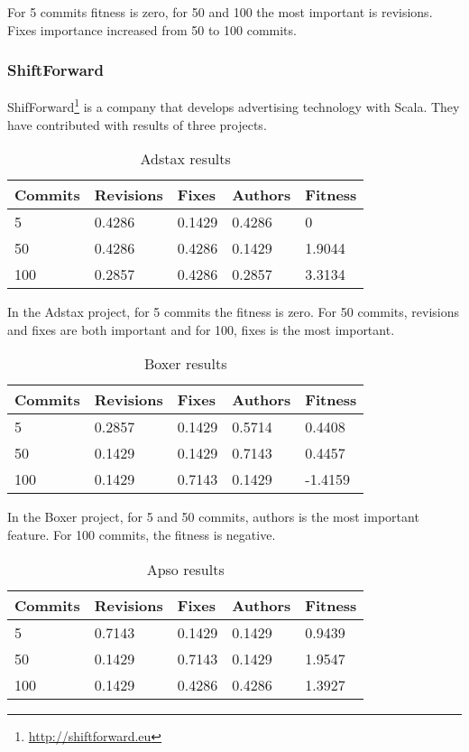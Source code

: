 For 5 commits fitness is zero, for 50 and 100 the most important is revisions.
Fixes importance increased from 50 to 100 commits.

\subsubsection{ShiftForward}
ShifForward\footnote{\url{http://shiftforward.eu}} is a company that develops
advertising technology with Scala. They have contributed with results of three
projects.

\begin{table}[H]
    \centering
    \caption{Adstax results}
    \label{table:learning_adstax}
    \begin{tabular}{|l|l|l|l|l|}
        \hline
        Commits & Revisions & Fixes & Authors & Fitness \\ \hline
        5         & 0.4286     & 0.1429 & 0.4286   & 0 \\ \hline
        50        & 0.4286 & 0.4286 & 0.1429   & 1.9044 \\ \hline
        100       & 0.2857     & 0.4286  & 0.2857   & 3.3134 \\ \hline
    \end{tabular}
\end{table}

In the Adstax project, for 5 commits the fitness is zero. For 50 commits,
revisions and fixes are both important and for 100, fixes is the most important.

\begin{table}[H]
    \centering
    \caption{Boxer results}
    \label{table:learning_boxer}
    \begin{tabular}{|l|l|l|l|l|}
        \hline
        Commits & Revisions & Fixes & Authors & Fitness \\ \hline
        5         & 0.2857     & 0.1429 & 0.5714   & 0.4408 \\ \hline
        50        & 0.1429 & 0.1429 & 0.7143   & 0.4457  \\ \hline
        100       & 0.1429     & 0.7143  & 0.1429   & -1.4159 \\ \hline
    \end{tabular}
\end{table}

In the Boxer project, for 5 and 50 commits, authors is the most important
feature. For 100 commits, the fitness is negative.

\begin{table}[H]
    \centering
    \caption{Apso results}
    \label{table:learning_apso}
    \begin{tabular}{|l|l|l|l|l|}
        \hline
        Commits & Revisions & Fixes & Authors & Fitness \\ \hline
        5         & 0.7143     & 0.1429 & 0.1429   & 0.9439 \\ \hline
        50        & 0.1429 & 0.7143 & 0.1429   & 1.9547 \\ \hline
        100       & 0.1429     & 0.4286  & 0.4286   & 1.3927 \\ \hline
    \end{tabular}
\end{table}

